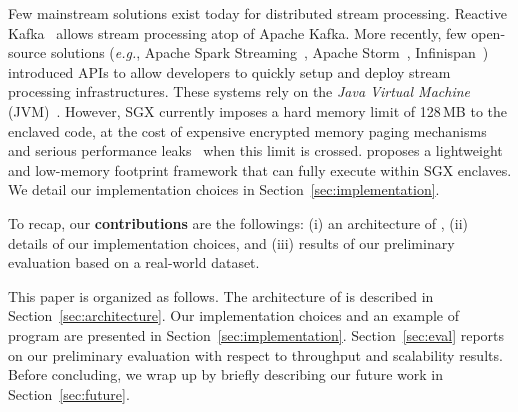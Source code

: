 Few mainstream solutions exist today for distributed stream processing.
Reactive Kafka~\cite{reactivekafka} allows stream processing atop of Apache Kafka.
More recently, few open-source solutions (\emph{e.g.}, Apache Spark Streaming~\cite{apachesparkstreaming}, Apache Storm~\cite{apachestorm}, Infinispan~\cite{infinispan}) introduced APIs to allow developers to quickly setup and deploy stream processing infrastructures.
These systems rely on the \emph{Java Virtual Machine} (JVM)~\cite{lindholm2014java}.
However, SGX currently imposes a hard memory limit of 128\,MB to the enclaved code, at the cost of expensive encrypted memory paging mechanisms and serious performance leaks~\cite{brenner_securekeeper:_2016} when this limit is crossed.
\SYS{} proposes a lightweight and low-memory footprint framework that can fully execute within SGX enclaves.
We detail our implementation choices in Section~\ref{sec:implementation}.

To recap, our \textbf{contributions} are the followings: (i) an architecture of \SYS{}, (ii) details of our implementation choices, and (iii) results of our preliminary evaluation based on a real-world dataset.

This paper is organized as follows.
The architecture of \SYS{} is described in Section~\ref{sec:architecture}.
Our implementation choices and an example of \SYS{} program are presented in Section~\ref{sec:implementation}.
Section~\ref{sec:eval} reports on our preliminary evaluation with respect to throughput and scalability results.
Before concluding, we wrap up by briefly describing our future work in Section~\ref{sec:future}.

